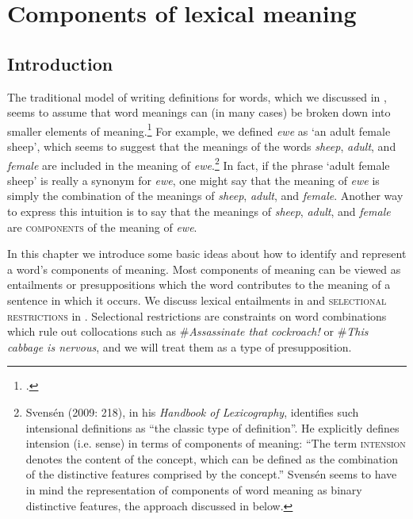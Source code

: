 \chapter{Components of lexical meaning}\label{sec:7}

\section{Introduction}\label{sec:7.1}

The traditional model of writing definitions for words, which we discussed in , seems to assume that word meanings can (in many cases) be broken down into smaller elements of meaning.\footnote{\citet[126]{Engelberg2011}.} For example, we defined \textit{ewe} as ‘an adult female sheep’, which seems to suggest that the meanings of the words \textit{sheep}, \textit{adult}, and \textit{female} are included in the meaning of \textit{ewe}.\footnote{Svensén (2009: 218), in his \textit{Handbook of Lexicography}, identifies such intensional definitions as “the classic type of definition”. He explicitly defines intension (i.e. sense) in terms of components of meaning: “The term \textsc{intension} denotes the content of the concept, which can be defined as the combination of the distinctive features comprised by the concept.” Svensén seems to have in mind the representation of components of word meaning as binary distinctive features, the approach discussed in  below.} In fact, if the phrase ‘adult female sheep’ is really a synonym for \textit{ewe}, one might say that the meaning of \textit{ewe} is simply the combination of the meanings of \textit{sheep}, \textit{adult}, and \textit{female}. Another way to express this intuition is to say that the meanings of \textit{sheep}, \textit{adult}, and \textit{female} are \textsc{components} of the meaning of \textit{ewe}.



In this chapter we introduce some basic ideas about how to identify and represent a word’s components of meaning. Most components of meaning can be viewed as entailments or presuppositions which the word contributes to the meaning of a sentence in which it occurs. We discuss lexical entailments in  and \textsc{selectional restrictions} in . Selectional restrictions are constraints on word combinations which rule out collocations such as \#\textit{Assassinate that cockroach!} or \#\textit{This cabbage is nervous}, and we will treat them as a type of presupposition.



